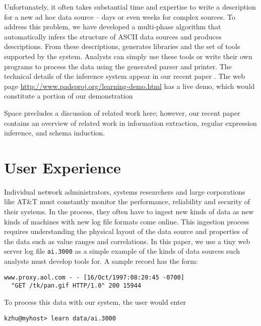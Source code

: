 \documentclass[preprint]{sig-alternate-sigmod08}
\begin{document}
Unfortunately, it often takes substantial time and expertise to write
a \pads{} description for a new ad hoc data source -- days or even
weeks for complex sources.  To address this problem, we have developed
a multi-phase algorithm that automatically infers the structure of
ASCII data sources and produces \pads{} descriptions.  From these
descriptions, \learnpads{} generates libraries and the set of tools
supported by the \pads{} system.  Analysts can simply use these tools
or write their own programs to process the data using the generated
parser and printer.  The technical details of the inference system 
appear in our recent paper
\cite{fisher+:dirttoshovels}.  The web page
\url{http://www.padsproj.org/learning-demo.html} has a live
demo, which would constitute a portion of our demonstration

Space precludes a discussion of related work here; however, our recent
paper~\cite{fisher+:dirttoshovels} contains an overview of related
work in information extraction, regular expression inference, and
schema induction.  

\section{User Experience}

Individual network administrators, systems researchers and large 
corporations like AT\&T must constantly monitor the performance,
reliability and security of their systems.
In the process, they often have to ingest new kinds of data
as new kinds of machines with new log file formats come
online.  This ingestion process requires understanding the physical
layout of the data source and properties of the data such as value
ranges and correlations.  In this paper, we use a tiny
web server log file {\tt ai.3000} as a simple example of the kinds of
data sources such analysts must develop tools for. A sample record has
the form:

{\small
\begin{verbatim}
www.proxy.aol.com - - [16/Oct/1997:08:20:45 -0700] 
  "GET /tk/pan.gif HTTP/1.0" 200 15944
\end{verbatim}
}

\noindent
To process this data with our system, the user would enter


{\small
\begin{verbatim}
kzhu@myhost> learn data/ai.3000 
\end{verbatim}
}
\end{document}
